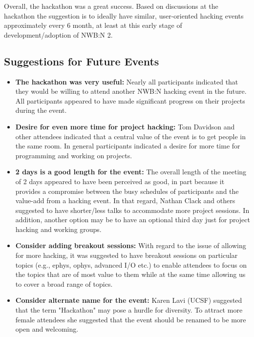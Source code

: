 \documentclass{article}
\begin{document}
Overall, the hackathon was a great success. Based on discussions at the hackathon the suggestion is to 
ideally have similar, user-oriented hacking events approximately every 6 month, 
at least at this early stage of development/adoption of NWB:N 2. 

\vspace{2cm} 
\subsection{Suggestions for Future Events}
\begin{itemize}
  \setlength\itemsep{0cm}
  \item \textbf{The hackathon was very useful:} Nearly all participants    
     indicated that they would be willing to attend another NWB:N 
     hacking event in the future. All participants appeared to have
     made significant progress on their projects during the event. 
  \item \textbf{Desire for even more time for project hacking:}
     Tom Davidson and other attendees indicated that a central 
     value of the event is to get people in the same room. In general 
     participants indicated a desire for more time for programming 
     and working on projects.
  \item \textbf{2 days is a good length for the event:} 
      The overall length of the meeting of 2 days appeared to have 
      been perceived as good, in part because it provides a compromise
      between the busy schedules of participants and the value-add from
      a hacking event. In that regard, Nathan Clack and others suggested
      to have shorter/less talks to accommodate more project sessions.
       In addition, another option may be to have an 
       optional third day
      just for project hacking and working groups.
   \item \textbf{Consider adding breakout sessions:} 
      With regard to the issue of allowing for more hacking, 
      it was suggested to have breakout sessions on particular topics 
      (e.g., ephys, ophys, advanced I/O etc.) to enable attendees to 
      focus on the topics that are of most value to them while at the
      same time allowing us to cover a broad range of topics.
   \item \textbf{Consider alternate name for the event:} Karen Lavi
      (UCSF) suggested that the term "Hackathon" may pose a hurdle for
      diversity. To attract more female attendees she suggested that
      the event should be renamed to be more open and welcoming. 

\end{itemize}
\end{document}
